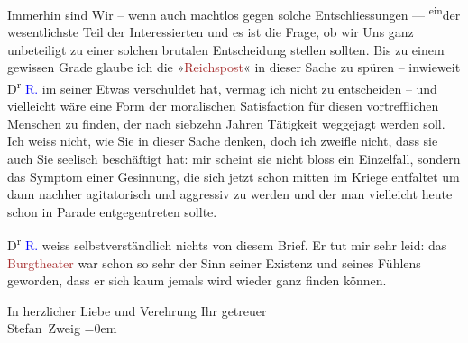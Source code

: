                Immerhin sind Wir – wenn auch machtlos gegen solche Entschliessungen — \substVorne{}\textsuperscript{ein}\substDazwischen{}der\substHinten{}
               wesentlichste Teil der Interessierten und es ist die Frage, ob wir Uns ganz
               unbeteiligt zu einer solchen brutalen Entscheidung stellen sollten. Bis zu einem
               gewissen Grade glaube ich die »\textcolor{brown}{Reichspost}\ledrightnote{\textcolor{brown}{Reichspost}}« in
               dieser Sache zu spüren – inwieweit D\textsuperscript{r}{ }\textcolor{blue}{R.}\ledrightnote{\textcolor{blue}{Richard Rosenbaum}} im seiner \label{K_L03653-3v}\label{K_L03653-3} Etwas verschuldet hat, vermag ich nicht zu entscheiden – und vielleicht wäre
               eine Form der moralischen Satisfaction für diesen vortrefflichen {\pb}Menschen zu finden, der nach siebzehn
               Jahren Tätigkeit \label{K_L03653-4v}\label{K_L03653-4}
               weggejagt werden soll. Ich weiss nicht, wie Sie in dieser Sache denken, doch ich
               zweifle nicht, dass sie auch Sie seelisch beschäftigt hat: mir scheint sie nicht
               bloss ein Einzelfall, sondern das Symptom einer Gesinnung, die sich jetzt schon
               mitten im Kriege entfaltet um dann nachher agitatorisch und aggressiv zu werden und
               der man vielleicht heute schon in Parade entgegentreten sollte.\pend
           
\pstart
           D\textsuperscript{r}{ }\textcolor{blue}{R.}\ledrightnote{\textcolor{blue}{Richard Rosenbaum}} weiss selbstverständlich nichts von diesem
               Brief. Er tut mir sehr leid: das \textcolor{brown}{Burgtheater}\ledrightnote{\textcolor{brown}{Burgtheater}} war
               schon so sehr der Sinn seiner Existenz und seines Fühlens geworden, dass er sich kaum
               jemals wird wieder ganz finden können.\pend
           
\pstart
           In herzlicher Liebe und Verehrung Ihr getreuer{\\[\baselineskip]}\spacefill\mbox{Stefan Zweig}\pend
           \leftskip=0em{}\endnumbering{}  
      